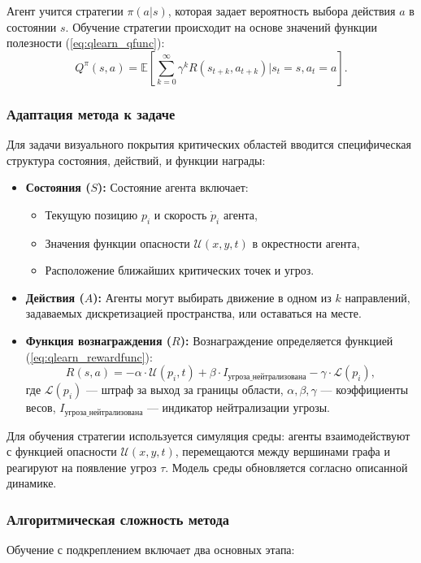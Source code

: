 Агент учится стратегии $\pi(a|s)$, которая задает вероятность выбора действия $a$ в состоянии $s$.
Обучение стратегии происходит на основе значений функции полезности (\ref{eq:qlearn_qfunc}):
\begin{equation}
	\label{eq:qlearn_qfunc}
	Q^\pi(s, a) = \mathbb{E} \left[ \sum_{k=0}^{\infty} \gamma^k R(s_{t+k}, a_{t+k}) \bigg| s_t = s, a_t = a \right].
\end{equation}

\subsubsection*{Адаптация метода к задаче}
Для задачи визуального покрытия критических областей вводится специфическая структура состояния, действий, и функции награды:
\begin{itemize}
	\item \textbf{Состояния ($S$):} Состояние агента включает:
	\begin{itemize}
		\item Текущую позицию $p_i$ и скорость $\dot{p}_i$ агента,
		\item Значения функции опасности $\mathcal{U}(x, y, t)$ в окрестности агента,
		\item Расположение ближайших критических точек и угроз.
	\end{itemize}
	\item \textbf{Действия ($A$):} Агенты могут выбирать движение в одном из $k$ направлений, задаваемых дискретизацией пространства, или оставаться на месте.
	\item \textbf{Функция вознаграждения ($R$):} Вознаграждение определяется функцией (\ref{eq:qlearn_rewardfunc}):
	\begin{equation}
		\label{eq:qlearn_rewardfunc}
		R(s, a) = -\alpha \cdot \mathcal{U}(p_i, t) + \beta \cdot I_{\text{угроза\_нейтрализована}} - \gamma \cdot \mathcal{L}(p_i),
	\end{equation}
	где $\mathcal{L}(p_i)$ — штраф за выход за границы области, $\alpha, \beta, \gamma$ — коэффициенты весов, $I_{\text{угроза\_нейтрализована}}$ — индикатор нейтрализации угрозы.
\end{itemize}

Для обучения стратегии используется симуляция среды: агенты взаимодействуют с функцией опасности $\mathcal{U}(x, y, t)$, перемещаются между вершинами графа и реагируют на появление угроз $\tau$.
Модель среды обновляется согласно описанной динамике.

\subsubsection*{Алгоритмическая сложность метода}
Обучение с подкреплением включает два основных этапа:

